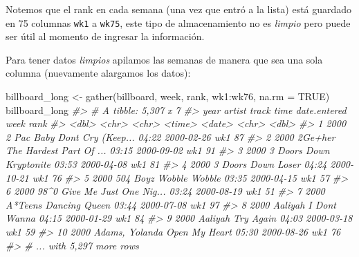 \documentclass[
]{book}
\newenvironment{Shaded}{\begin{snugshade}}{\end{snugshade}}
\newcommand{\AttributeTok}[1]{\textcolor[rgb]{0.77,0.63,0.00}{#1}}
\newcommand{\CommentTok}[1]{\textcolor[rgb]{0.56,0.35,0.01}{\textit{#1}}}
\newcommand{\ConstantTok}[1]{\textcolor[rgb]{0.00,0.00,0.00}{#1}}
\newcommand{\FunctionTok}[1]{\textcolor[rgb]{0.00,0.00,0.00}{#1}}
\newcommand{\NormalTok}[1]{#1}
\newcommand{\OtherTok}[1]{\textcolor[rgb]{0.56,0.35,0.01}{#1}}
\newcommand{\SpecialCharTok}[1]{\textcolor[rgb]{0.00,0.00,0.00}{#1}}
\begin{document}
Notemos que el rank en cada semana (una vez que entró a la lista) está guardado
en 75 columnas \texttt{wk1} a \texttt{wk75}, este tipo de almacenamiento no es \emph{limpio} pero
puede ser útil al momento de ingresar la información.

Para tener datos \emph{limpios} apilamos las semanas de manera que sea una sola
columna (nuevamente alargamos los datos):

\begin{Shaded}
\begin{Highlighting}[]
\NormalTok{billboard\_long }\OtherTok{\textless{}{-}} \FunctionTok{gather}\NormalTok{(billboard, week, rank, wk1}\SpecialCharTok{:}\NormalTok{wk76, }\AttributeTok{na.rm =} \ConstantTok{TRUE}\NormalTok{)}
\NormalTok{billboard\_long}
\CommentTok{\#\textgreater{} \# A tibble: 5,307 x 7}
\CommentTok{\#\textgreater{}     year artist         track                   time   date.entered week   rank}
\CommentTok{\#\textgreater{}    \textless{}dbl\textgreater{} \textless{}chr\textgreater{}          \textless{}chr\textgreater{}                   \textless{}time\textgreater{} \textless{}date\textgreater{}       \textless{}chr\textgreater{} \textless{}dbl\textgreater{}}
\CommentTok{\#\textgreater{}  1  2000 2 Pac          Baby Don\textquotesingle{}t Cry (Keep... 04:22  2000{-}02{-}26   wk1      87}
\CommentTok{\#\textgreater{}  2  2000 2Ge+her        The Hardest Part Of ... 03:15  2000{-}09{-}02   wk1      91}
\CommentTok{\#\textgreater{}  3  2000 3 Doors Down   Kryptonite              03:53  2000{-}04{-}08   wk1      81}
\CommentTok{\#\textgreater{}  4  2000 3 Doors Down   Loser                   04:24  2000{-}10{-}21   wk1      76}
\CommentTok{\#\textgreater{}  5  2000 504 Boyz       Wobble Wobble           03:35  2000{-}04{-}15   wk1      57}
\CommentTok{\#\textgreater{}  6  2000 98\^{}0           Give Me Just One Nig... 03:24  2000{-}08{-}19   wk1      51}
\CommentTok{\#\textgreater{}  7  2000 A*Teens        Dancing Queen           03:44  2000{-}07{-}08   wk1      97}
\CommentTok{\#\textgreater{}  8  2000 Aaliyah        I Don\textquotesingle{}t Wanna           04:15  2000{-}01{-}29   wk1      84}
\CommentTok{\#\textgreater{}  9  2000 Aaliyah        Try Again               04:03  2000{-}03{-}18   wk1      59}
\CommentTok{\#\textgreater{} 10  2000 Adams, Yolanda Open My Heart           05:30  2000{-}08{-}26   wk1      76}
\CommentTok{\#\textgreater{} \# ... with 5,297 more rows}
\end{Highlighting}
\end{Shaded}
\end{document}
